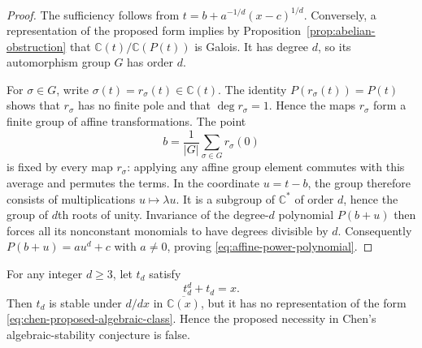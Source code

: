 \begin{proof}
The sufficiency follows from
$t=b+a^{-1/d}(x-c)^{1/d}$. Conversely, a representation of the proposed form
implies by Proposition~\ref{prop:abelian-obstruction} that
$\mathbb C(t)/\mathbb C(P(t))$ is Galois. It has degree $d$, so its
automorphism group $G$ has order $d$.

For $\sigma\in G$, write $\sigma(t)=r_\sigma(t)\in\mathbb C(t)$. The identity
$P(r_\sigma(t))=P(t)$ shows that $r_\sigma$ has no finite pole and that
$\deg r_\sigma=1$. Hence the maps $r_\sigma$ form a finite group of affine
transformations. The point
\[
 b=\frac1{|G|}\sum_{\sigma\in G}r_\sigma(0)
\]
is fixed by every map $r_\sigma$: applying any affine group element commutes
with this average and permutes the terms. In the coordinate $u=t-b$, the
group therefore consists of multiplications $u\mapsto\lambda u$. It is a
subgroup of $\mathbb C^*$ of order $d$, hence the group of $d$th roots of
unity. Invariance of the degree-$d$ polynomial $P(b+u)$ then forces all its
nonconstant monomials to have degrees divisible by $d$. Consequently
$P(b+u)=au^d+c$ with $a\ne0$, proving \eqref{eq:affine-power-polynomial}.
\end{proof}

\begin{theorem}
\label{thm:polynomial-inverse-counterexamples}
For any integer $d\ge3$, let $t_d$ satisfy
\begin{equation}\label{eq:inverse-family}
 t_d^d+t_d=x.
\end{equation}
Then $t_d$ is stable under $d/dx$ in $\overline{\mathbb C(x)}$, but it has
no representation of the form \eqref{eq:chen-proposed-algebraic-class}.
Hence the proposed necessity in Chen's algebraic-stability conjecture is false.
\end{theorem}

